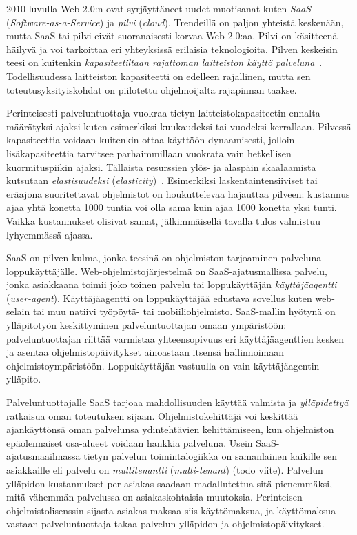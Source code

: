 \documentclass[finnish,gradu]{tktltiki}
\begin{document}
  2010-luvulla Web 2.0:n ovat syrjäyttäneet uudet muotisanat kuten \emph{SaaS} (\emph{Software-as-a-Service}) ja \emph{pilvi} (\emph{cloud}). Trendeillä on paljon yhteistä keskenään, mutta SaaS tai pilvi eivät suoranaisesti korvaa Web 2.0:aa. Pilvi on käsitteenä häilyvä ja voi tarkoittaa eri yhteyksissä erilaisia teknologioita. Pilven keskeisin teesi on kuitenkin \emph{kapasiteetiltaan rajattoman laitteiston käyttö palveluna}~\cite{berkeley_cloud_2009}. Todellisuudessa laitteiston kapasiteetti on edelleen rajallinen, mutta sen toteutusyksityiskohdat on piilotettu ohjelmoijalta rajapinnan taakse.

   Perinteisesti palveluntuottaja vuokraa tietyn laitteistokapasiteetin ennalta määrätyksi ajaksi kuten esimerkiksi kuukaudeksi tai vuodeksi kerrallaan. Pilvessä kapasiteettia voidaan kuitenkin ottaa käyttöön dynaamisesti, jolloin lisäkapasiteettia tarvitsee parhaimmillaan vuokrata vain hetkellisen kuormituspiikin ajaksi. Tällaista resurssien ylös- ja alaspäin skaalaamista kutsutaan \emph{elastisuudeksi} (\emph{elasticity})~\cite{berkeley_cloud_2009}. Esimerkiksi laskentaintensiiviset tai eräajona suoritettavat ohjelmistot on houkuttelevaa hajauttaa pilveen: kustannus ajaa yhtä konetta 1000 tuntia voi olla sama kuin ajaa 1000 konetta yksi tunti. Vaikka kustannukset olisivat samat, jälkimmäisellä tavalla tulos valmistuu lyhyemmässä ajassa.

  SaaS on pilven kulma, jonka teesinä on ohjelmiston tarjoaminen palveluna loppukäyttäjälle. Web-ohjelmistojärjestelmä on SaaS-ajatusmallissa palvelu, jonka asiakkaana toimii joko toinen palvelu tai loppukäyttäjän \emph{käyttäjäagentti} (\emph{user-agent}). Käyttäjäagentti on loppukäyttäjää edustava sovellus kuten web-selain tai muu natiivi työpöytä- tai mobiiliohjelmisto. SaaS-mallin  hyötynä on ylläpitotyön keskittyminen palveluntuottajan omaan ympäristöön: palveluntuottajan riittää varmistaa yhteensopivuus eri käyttäjäagenttien kesken ja asentaa ohjelmistopäivitykset ainoastaan itsensä hallinnoimaan ohjelmistoympäristöön. Loppukäyttäjän vastuulla on vain käyttäjäagentin ylläpito.

  Palveluntuottajalle SaaS tarjoaa mahdollisuuden käyttää valmista ja \emph{ylläpidettyä} ratkaisua oman toteutuksen sijaan. Ohjelmistokehittäjä voi keskittää ajankäyttönsä oman palvelunsa ydintehtävien kehittämiseen, kun ohjelmiston epäolennaiset osa-alueet voidaan hankkia palveluna. Usein SaaS-ajatusmaailmassa tietyn palvelun toimintalogiikka on samanlainen kaikille sen asiakkaille eli palvelu on \emph{multitenantti} (\emph{multi-tenant}) (todo viite). Palvelun ylläpidon kustannukset per asiakas saadaan madallutettua sitä pienemmäksi, mitä vähemmän palvelussa on asiakaskohtaisia muutoksia. Perinteisen ohjelmistolisenssin sijasta asiakas maksaa siis käyttömaksua, ja käyttömaksua vastaan palveluntuottaja takaa palvelun ylläpidon ja ohjelmistopäivitykset.
\end{document}
